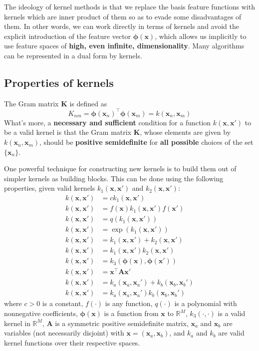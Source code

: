 \documentclass[a4paper]{book}
\renewcommand{\bf}{\mathbf}
\newcommand{\bb}{\mathbb}
\newcommand{\bs}{\boldsymbol}
\begin{document}
The ideology of kernel methods is that we replace the basis feature functions with kernels which are inner product of them so as to evade some disadvantages of them. In other words, we can work directly in terms of kernels and avoid the explicit introduction of the feature vector $\bs{\phi}(\bf{x})$, which allows us implicitly to use feature spaces of \textbf{high, even infinite, dimensionality}. Many algorithms can be represented in a dual form by kernels.

\subsection{Properties of kernels}
The Gram matrix $\bf{K}$ is defined as
\begin{equation}
	K_{nm} = \bs{\phi}(\bf{x}_n)^{\intercal} \bs{\phi}(\bf{x}_m) = k(\bf{x}_n,\bf{x}_m)
\end{equation}
What's more, a \textbf{necessary and sufficient} condition for a function $k(\bf{x,x'})$ to be a valid kernel is that the Gram matrix $\bf{K}$, whose elements are given by $k(\bf{x}_n,\bf{x}_m)$, should be \textbf{positive semidefinite} for \textbf{all possible} choices of the set $\{ \bf{x}_n \}$.

One powerful technique for constructing new kernels is to build them out of simpler kernels as building blocks. This can be done using the following properties, given valid kernels $k_1(\bf{x,x'})$ and $k_2(\bf{x,x'})$:
\begin{align}
	k(\bf{x,x'}) &= ck_1(\bf{x,x'}) \\
	k(\bf{x,x'}) &= f(\bf{x})k_1(\bf{x,x'})f(\bf{x'})\\
	k(\bf{x,x'}) &= q(k_1(\bf{x,x'}))\\
	k(\bf{x,x'}) &= \exp (k_1(\bf{x,x'}))\\
	k(\bf{x,x'}) &=k_1(\bf{x,x'})+k_2(\bf{x,x'})\\
	k(\bf{x,x'}) &=k_1(\bf{x,x'})k_2(\bf{x,x'})\\
	k(\bf{x,x'}) &=k_3(\bs{\phi}(\bf{x}),\bs{\phi}(\bf{x'}))\\
	k(\bf{x,x'}) &=\bf{x}^{\intercal} \bf{Ax'}\\
	k(\bf{x,x'}) &=k_a (\bf{x}_a,\bf{x}_a')+k_b(\bf{x}_b,\bf{x}_b')\\
	k(\bf{x,x'}) &=k_a (\bf{x}_a,\bf{x}_a')k_b(\bf{x}_b,\bf{x}_b')
\end{align}
where $c > 0$ is a constant, $f(\cdot)$ is any function, $q(\cdot)$ is a polynomial with nonnegative coefficients, $\bs{\phi}(\bf{x})$ is a function from $\bf{x}$ to $\bb{R}^M$, $k_3(\cdot,\cdot)$ is a valid kernel in $\bb{R}^M$, $\bf{A}$ is a symmetric positive semidefinite matrix, $\bf{x}_a$ and $\bf{x}_b$ are variables (not necessarily disjoint) with $\bf{x} = (\bf{x}_a, \bf{x}_b)$, and $k_a$ and $k_b$ are valid kernel functions over their respective spaces.
\end{document}
